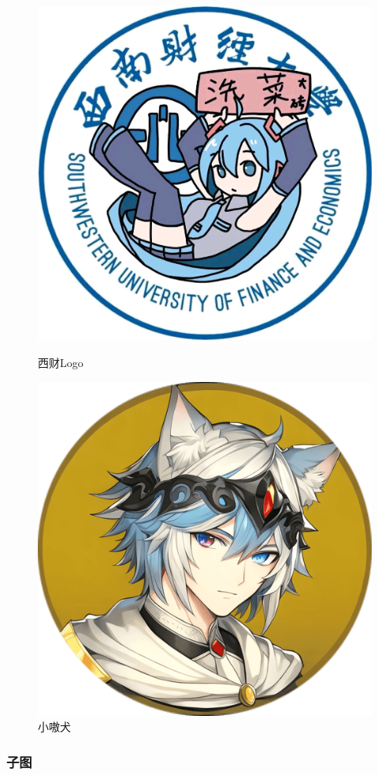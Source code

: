 \begin{figure}[htb]
\centering
\begin{minipage}{0.7\linewidth}
\centering
\begin{minipage}{0.49\linewidth}
\centering
\includegraphics[width=0.7\linewidth]{img/swufe_logo.jpg}
\caption{西财Logo}
\label{fig:西财Logo独立标题子图}
\end{minipage}
\hfill
\begin{minipage}{0.49\linewidth}
\centering
\includegraphics[width=0.7\linewidth]{img/小嗷犬.png}
\caption{小嗷犬}
\label{fig:小嗷犬独立标题子图}
\end{minipage}
\end{minipage}
\end{figure}

\subsubsection{子图}

